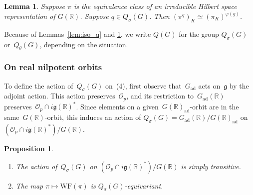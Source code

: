 \documentclass[10pt,leqno]{article}
\newtheorem{lemma}[equation]{Lemma}
\newtheorem{proposition}[equation]{Proposition}
\numberwithin{equation}{section}
\newcommand{\Gad}{G_\mathrm{ad}}
\renewcommand{\O}{\mathcal O}
\newcommand{\R}{\mathbb R}
\newcommand{\g}{\mathfrak g}
\newcommand{\WF}{\mathrm{WF}}
\newcommand{\Op}{\O_p}
\begin{document}
\begin{lemma}\label{lem:action_q}
Suppose $\pi$ is the equivalence class of an irreducible Hilbert space representation of $G(\R)$. 
Suppose $q\in Q_\sigma(G)$. 
Then $(\pi^q)_K\simeq (\pi_K)^{\varphi(g)}$.
\end{lemma}



Because of Lemmas~\ref{lem:iso_q} and \ref{lem:action_q}, we write $Q(G)$ for the group $Q_\sigma(G)$ or~$Q_\theta(G)$, depending on the situation.



\subsubsection*{On real nilpotent orbits} 

To define the action of~$Q_{\sigma}(G)$ on~(4), first observe that~$\Gad$ acts on~$\g$ by the adjoint action. This action preserves~$\Op$, and its restriction to~$\Gad(\R)$ preserves~$\Op\cap i\g(\R)^*$. Since elements on a given~$G(\R)_{\mathrm{ad}}$-orbit are in the same~$G(\R)$-orbit, this induces an action of $Q_{\sigma}(G)=\Gad(\R)/G(\R)_{\mathrm{ad}}$ on~$(\Op\cap i\g(\R)^*)/G(\R)$.

\begin{proposition}\label{prop:action_on_real_orbits}
\begin{enumerate} 
\item The action of~$Q_{\sigma}(G)$ on $(\Op\cap i\g(\R)^*)/G(\R)$ is simply transitive.
\item The map $\pi \mapsto \WF(\pi)$ is $Q_{\sigma}(G)$-equivariant.
\end{enumerate}
\end{proposition}
\end{document}
